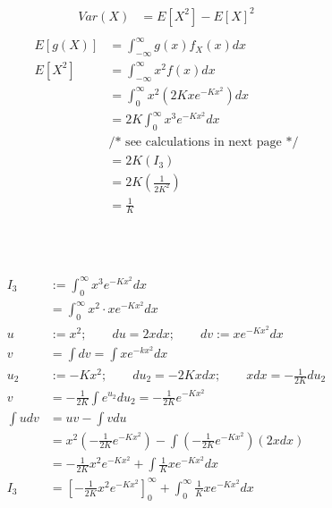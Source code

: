 \documentclass[12pt,border=4pt,multi]{article}%
\begin{document}
\begin{align*}
Var(X) &= E[X^2] - E[X]^2\\
\end{align*}
\begin{align*}
E[g(X)] &= \int_{-\infty}^{\infty} g(x) f_X(x) dx\\ 
E[X^2] &= \int_{-\infty}^{\infty} x^2 f(x) dx\\
&=  \int_{0}^{\infty} x^2 \left(2Kxe^{-Kx^2}\right) dx\\
&= 2K\int_{0}^{\infty} x^3 e^{-Kx^2} dx\\
&\text{/* see calculations in next page */}\\
&= 2K(I_3)\\
&= 2K\left(\frac{1}{2K^2}\right)\\
&= \frac{1}{K}\\
\end{align*}
\\
\\
\\
\begin{align*}
I_3 &:= \int_0^{\infty} x^3 e^{-Kx^2} dx\\
&= \int_0^{\infty} x^2 \cdot x e^{-Kx^2} dx\\
u &:= x^2; \qquad du = 2xdx; \qquad dv := xe^{-Kx^2}dx\\
v &= \int dv = \int xe^{-kx^2} dx\\
u_2 &:= -Kx^2; \qquad du_2 = -2Kxdx; \qquad xdx = -\frac{1}{2K}du_2\\
v &= -\frac{1}{2K}\int e^{u_2} du_2 = -\frac{1}{2K}e^{-Kx^2}\\
\int udv &= uv - \int vdu\\
&= x^2\left(-\frac{1}{2K}e^{-Kx^2}\right) - \int\left(-\frac{1}{2K}e^{-Kx^2}\right)\left(2xdx\right)\\
&= -\frac{1}{2K}x^2e^{-Kx^2} + \int\frac{1}{K}xe^{-Kx^2}dx\\
I_3 &= \left[-\frac{1}{2K}x^2e^{-Kx^2}\right]_0^{\infty} + \int_0^{\infty}\frac{1}{K}xe^{-Kx^2}dx\\
\end{align*}
\end{document}
